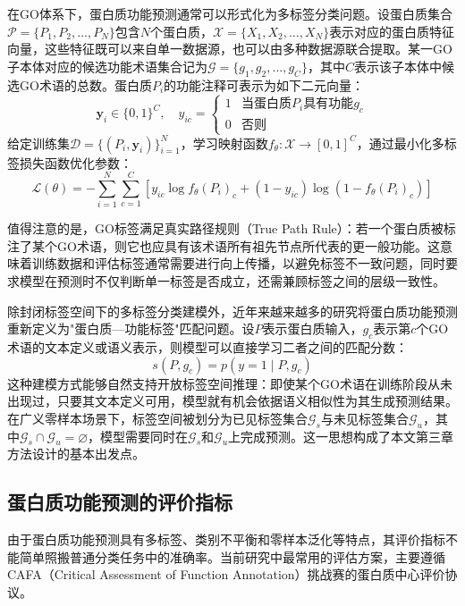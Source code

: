 在GO体系下，蛋白质功能预测通常可以形式化为多标签分类问题。设蛋白质集合$\mathcal{P}=\{P_1,P_2,\ldots,P_N\}$包含$N$个蛋白质，$\mathcal{X} = \{X_1, X_2, \ldots, X_N\}$表示对应的蛋白质特征向量，这些特征既可以来自单一数据源，也可以由多种数据源联合提取。某一GO子本体对应的候选功能术语集合记为$\mathcal{G} = \{g_1, g_2, \ldots, g_C\}$，其中$C$表示该子本体中候选GO术语的总数。蛋白质$P_i$的功能注释可表示为如下二元向量：
\begin{equation}
\mathbf{y}_i \in \{0,1\}^C, \quad y_{ic} =
\begin{cases}
1 & \text{当蛋白质}P_i\text{具有功能}g_c \\
0 & \text{否则}
\end{cases}
\end{equation}
给定训练集$\mathcal{D} = \{(P_i, \mathbf{y}_i)\}_{i=1}^{N}$，学习映射函数$f_\theta: \mathcal{X} \to [0,1]^C$，通过最小化多标签损失函数优化参数：
\begin{equation}
\mathcal{L}(\theta) = -\sum_{i=1}^{N}\sum_{c=1}^{C}\left[y_{ic}\log f_\theta(P_i)_c + (1-y_{ic})\log(1-f_\theta(P_i)_c)\right]
\end{equation}

值得注意的是，GO标签满足真实路径规则（True Path Rule）：若一个蛋白质被标注了某个GO术语，则它也应具有该术语所有祖先节点所代表的更一般功能。这意味着训练数据和评估标签通常需要进行向上传播，以避免标签不一致问题，同时要求模型在预测时不仅判断单一标签是否成立，还需兼顾标签之间的层级一致性。

除封闭标签空间下的多标签分类建模外，近年来越来越多的研究将蛋白质功能预测重新定义为"蛋白质—功能标签"匹配问题。设$P$表示蛋白质输入，$g_c$表示第$c$个GO术语的文本定义或语义表示，则模型可以直接学习二者之间的匹配分数：
\begin{equation}
s(P, g_c) = p(y=1 \mid P, g_c)
\end{equation}
这种建模方式能够自然支持开放标签空间推理：即使某个GO术语在训练阶段从未出现过，只要其文本定义可用，模型就有机会依据语义相似性为其生成预测结果。在广义零样本场景下，标签空间被划分为已见标签集合$\mathcal{G}_s$与未见标签集合$\mathcal{G}_u$，其中$\mathcal{G}_s \cap \mathcal{G}_u = \varnothing$，模型需要同时在$\mathcal{G}_s$和$\mathcal{G}_u$上完成预测。这一思想构成了本文第三章方法设计的基本出发点。

\subsection{蛋白质功能预测的评价指标}

由于蛋白质功能预测具有多标签、类别不平衡和零样本泛化等特点，其评价指标不能简单照搬普通分类任务中的准确率。当前研究中最常用的评估方案，主要遵循CAFA（Critical Assessment of Function Annotation）挑战赛\cite{zhou2019cafa}的蛋白质中心评价协议。

